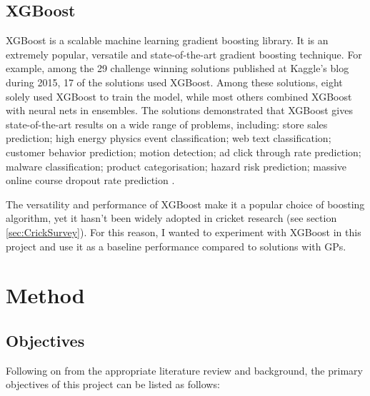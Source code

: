 \documentclass[12pt,a4paper]{report}
\theoremstyle{definition}
\begin{document}
\section{XGBoost}

XGBoost is a scalable machine learning gradient boosting library.  
It is an extremely popular, versatile and state-of-the-art gradient boosting technique.
For example, among the 29 challenge winning solutions published at Kaggle’s blog during 2015, 17 of the solutions used XGBoost.
Among these solutions, eight solely used XGBoost to train the model, while most others combined XGBoost with neural nets in ensembles.
The solutions demonstrated that XGBoost gives state-of-the-art results on a wide range of problems, including: store sales prediction; high energy physics event classification; web text classification; customer behavior prediction; motion detection; ad click through rate prediction; malware classification; product categorisation; hazard risk prediction; massive online course dropout rate prediction \citep{Chen2016}.

The versatility and performance of XGBoost make it a popular choice of boosting algorithm, yet it hasn't been widely adopted in cricket research (see section \ref{sec:CrickSurvey}).
For this reason, I wanted to experiment with XGBoost in this project and use it as a baseline performance compared to solutions with GPs.

\chapter{Method} \label{chap:Method}

\section{Objectives}

Following on from the appropriate literature review and background, the primary objectives of this project can be listed as follows:
\end{document}
